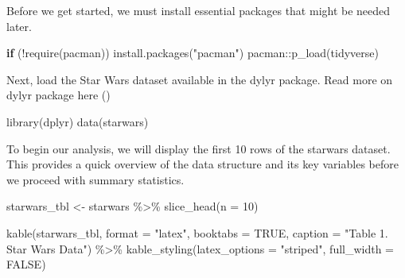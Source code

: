 \documentclass[
  man,
  floatsintext,
  longtable,
  nolmodern,
  notxfonts,
  notimes,
  colorlinks=true,linkcolor=blue,citecolor=blue,urlcolor=blue]{apa7}
\newenvironment{Shaded}{\begin{snugshade}}{\end{snugshade}}
\newcommand{\AttributeTok}[1]{\textcolor[rgb]{0.40,0.45,0.13}{#1}}
\newcommand{\ConstantTok}[1]{\textcolor[rgb]{0.56,0.35,0.01}{#1}}
\newcommand{\ControlFlowTok}[1]{\textcolor[rgb]{0.00,0.23,0.31}{\textbf{#1}}}
\newcommand{\DecValTok}[1]{\textcolor[rgb]{0.68,0.00,0.00}{#1}}
\newcommand{\FunctionTok}[1]{\textcolor[rgb]{0.28,0.35,0.67}{#1}}
\newcommand{\NormalTok}[1]{\textcolor[rgb]{0.00,0.23,0.31}{#1}}
\newcommand{\OtherTok}[1]{\textcolor[rgb]{0.00,0.23,0.31}{#1}}
\newcommand{\SpecialCharTok}[1]{\textcolor[rgb]{0.37,0.37,0.37}{#1}}
\newcommand{\StringTok}[1]{\textcolor[rgb]{0.13,0.47,0.30}{#1}}
\begin{document}
Before we get started, we must install essential packages that might be
needed later.

\begin{Shaded}
\begin{Highlighting}[]
\ControlFlowTok{if}\NormalTok{ (}\SpecialCharTok{!}\FunctionTok{require}\NormalTok{(pacman)) }\FunctionTok{install.packages}\NormalTok{(}\StringTok{"pacman"}\NormalTok{)}
\NormalTok{pacman}\SpecialCharTok{::}\FunctionTok{p\_load}\NormalTok{(tidyverse)}
\end{Highlighting}
\end{Shaded}

Next, load the Star Wars dataset available in the dylyr package. Read
more on dylyr package here ()

\begin{Shaded}
\begin{Highlighting}[]
\FunctionTok{library}\NormalTok{(dplyr)}
\FunctionTok{data}\NormalTok{(starwars)}
\end{Highlighting}
\end{Shaded}

To begin our analysis, we will display the first 10 rows of the starwars
dataset. This provides a quick overview of the data structure and its
key variables before we proceed with summary statistics.

\begin{Shaded}
\begin{Highlighting}[]
\NormalTok{starwars\_tbl }\OtherTok{\textless{}{-}}\NormalTok{ starwars }\SpecialCharTok{\%\textgreater{}\%}
  \FunctionTok{slice\_head}\NormalTok{(}\AttributeTok{n =} \DecValTok{10}\NormalTok{)}

\FunctionTok{kable}\NormalTok{(starwars\_tbl, }\AttributeTok{format =} \StringTok{"latex"}\NormalTok{, }\AttributeTok{booktabs =} \ConstantTok{TRUE}\NormalTok{, }\AttributeTok{caption =} \StringTok{"Table 1. Star Wars Data"}\NormalTok{) }\SpecialCharTok{\%\textgreater{}\%}
  \FunctionTok{kable\_styling}\NormalTok{(}\AttributeTok{latex\_options =} \StringTok{"striped"}\NormalTok{, }\AttributeTok{full\_width =} \ConstantTok{FALSE}\NormalTok{)}
\end{Highlighting}
\end{Shaded}
\end{document}
